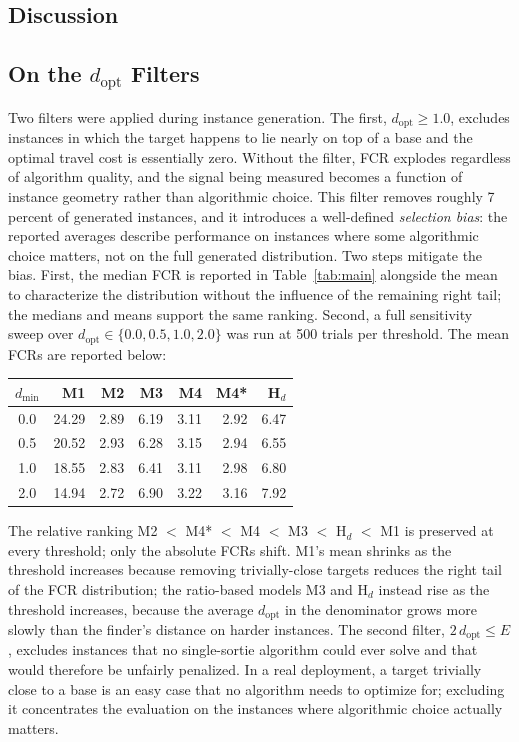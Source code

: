 \begin{doublespacing}


\section{Discussion}

\subsection{On the $d_{\mathrm{opt}}$ Filters}

Two filters were applied during instance generation. The first,
$d_{\mathrm{opt}} \geq 1.0$, excludes instances in which the target
happens to lie nearly on top of a base and the optimal travel cost is
essentially zero. Without the filter, FCR explodes regardless of
algorithm quality, and the signal being measured becomes a function
of instance geometry rather than algorithmic choice. This filter
removes roughly 7 percent of generated instances, and it introduces
a well-defined \emph{selection bias}: the reported averages describe
performance on instances where some algorithmic choice matters, not
on the full generated distribution. Two steps mitigate the bias.
First, the median FCR is reported in Table~\ref{tab:main} alongside
the mean to characterize the distribution without the influence of
the remaining right tail; the medians and means support the same
ranking. Second, a full sensitivity sweep over
$d_{\mathrm{opt}} \in \{0.0, 0.5, 1.0, 2.0\}$ was run at 500 trials
per threshold. The mean FCRs are reported below:

\begin{center}
\footnotesize
\begin{tabular}{@{}crrrrrr@{}}
\toprule
$d_{\min}$ & M1 & M2 & M3 & M4 & M4* & H$_d$ \\
\midrule
0.0 & 24.29 & 2.89 & 6.19 & 3.11 & 2.92 & 6.47 \\
0.5 & 20.52 & 2.93 & 6.28 & 3.15 & 2.94 & 6.55 \\
1.0 & 18.55 & 2.83 & 6.41 & 3.11 & 2.98 & 6.80 \\
2.0 & 14.94 & 2.72 & 6.90 & 3.22 & 3.16 & 7.92 \\
\bottomrule
\end{tabular}
\end{center}

The relative ranking
M2 $<$ M4* $<$ M4 $<$ M3 $<$ H$_d$ $<$ M1 is preserved at every
threshold; only the absolute FCRs shift. M1's mean shrinks as the
threshold increases because removing trivially-close targets reduces
the right tail of the FCR distribution; the ratio-based models
M3 and H$_d$ instead rise as the threshold increases, because the
average $d_{\mathrm{opt}}$ in the denominator grows more slowly than
the finder's distance on harder instances. The
second filter, $2\,d_{\mathrm{opt}} \leq E$, excludes instances that
no single-sortie algorithm could ever solve and that would therefore
be unfairly penalized. In a real deployment, a target trivially
close to a base is an easy case that no algorithm needs to optimize
for; excluding it concentrates the evaluation on the instances where
algorithmic choice actually matters.


\end{doublespacing}
